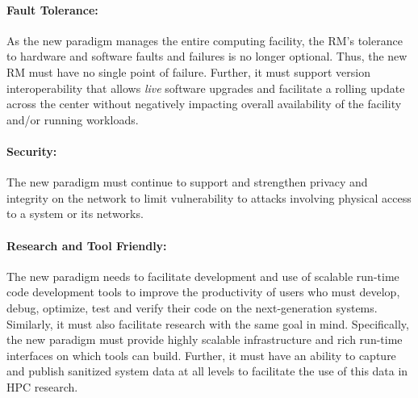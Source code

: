 \documentclass[10pt]{article}
\newcommand{\ngrm}{NGRM}
\begin{document}
\paragraph{Fault Tolerance:}
As the new paradigm manages the entire computing facility,
the RM's tolerance to hardware and software faults and failures
is no longer optional.
Thus, the new RM must have no single point of failure. Further, it must support
version interoperability that allows {\em live} software upgrades
and facilitate a rolling update across the center
without negatively impacting overall availability of 
the facility and/or running workloads.


\paragraph{Security:}
The new paradigm must continue to support and strengthen privacy 
and integrity on
the network to limit vulnerability to attacks involving physical access
to a system or its networks.

%


\paragraph{Research and Tool Friendly:}
The new paradigm needs to facilitate development and use of 
scalable run-time code development tools to improve the productivity
of users who must develop, debug, optimize, test and verify their code
on the next-generation systems. 
Similarly, it must
also facilitate research with the same goal in mind.
Specifically, the new paradigm must provide highly scalable infrastructure
and rich run-time interfaces
on which tools can build. Further, it must have 
an ability to capture and publish sanitized system data at all levels to facilitate the use of
this data in HPC research. 
\end{document}
